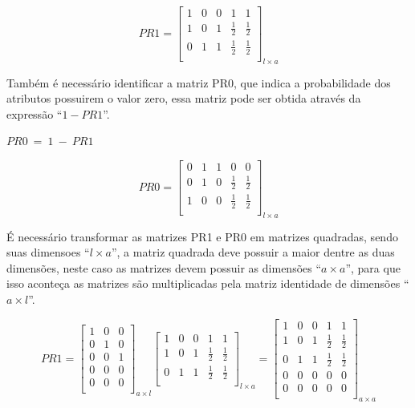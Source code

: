 $$PR1=\left[
\begin{array}{ccccc}
1 & 0 & 0 & 1 & 1 \\
1 & 0 & 1 & \frac{1}{2} & \frac{1}{2} \\
0 & 1 & 1 & \frac{1}{2} & \frac{1}{2} \\
\end{array}
\right]_{l \times a}$$

Também é necessário identificar a matriz PR0, que indica a probabilidade dos
atributos possuirem o valor zero, essa matriz pode ser obtida através da
expressão ``$1 - PR1$''.

\begin{center}
$PR0 \ = \ 1 \ - \ PR1$
\end{center}

$$PR0=\left[
\begin{array}{ccccc}
0 & 1 & 1 & 0 & 0 \\
0 & 1 & 0 & \frac{1}{2} & \frac{1}{2} \\
1 & 0 & 0 & \frac{1}{2} & \frac{1}{2} \\
\end{array}
\right]_{l \times a}$$

É necessário transformar as matrizes PR1 e PR0 em matrizes quadradas,
sendo suas dimensoes ``${l \times a}$'', a matriz quadrada deve possuir
a maior dentre as duas dimensões, neste caso as matrizes devem possuir
as dimensões ``${a \times a}$'', para que isso aconteça as matrizes são
multiplicadas pela matriz identidade de dimensões ``${a \times l}$''.

$$PR1=\left[
\begin{array}{ccc}
1 & 0 & 0 \\
0 & 1 & 0 \\
0 & 0 & 1 \\
0 & 0 & 0 \\
0 & 0 & 0 \\
\end{array}
\right]_{a \times l}
\left[
\begin{array}{ccccc}
1 & 0 & 0 & 1 & 1 \\
1 & 0 & 1 & \frac{1}{2} & \frac{1}{2} \\
0 & 1 & 1 & \frac{1}{2} & \frac{1}{2} \\
\end{array}
\right]_{l \times a}
= \left[
\begin{array}{ccccc}
1 & 0 & 0 & 1 & 1 \\
1 & 0 & 1 & \frac{1}{2} & \frac{1}{2} \\
0 & 1 & 1 & \frac{1}{2} & \frac{1}{2} \\
0 & 0 & 0 & 0 & 0 \\
0 & 0 & 0 & 0 & 0 \\
\end{array}
\right]_{a \times a}$$

